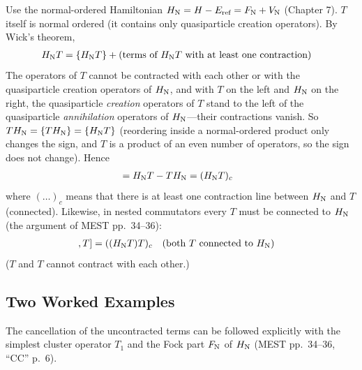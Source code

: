 Use the normal-ordered Hamiltonian $H_{\mathrm{N}}  = H - E_{\text{ref}} = F_{\mathrm{N}}  + V_{\mathrm{N}}$ (Chapter 7). $T$ itself is normal ordered (it contains only quasiparticle creation operators). By Wick's theorem,
\begin{align*}
H_{\mathrm{N}} T &= \{H_{\mathrm{N}} T\} + (\text{terms of } H_{\mathrm{N}} T \text{ with at least one contraction})
\end{align*}
The operators of $T$ cannot be contracted with each other or with the quasiparticle creation operators of $H_{\mathrm{N}}$, and with $T$ on the left and $H_{\mathrm{N}}$ on the right, the quasiparticle \emph{creation} operators of $T$ stand to the left of the quasiparticle \emph{annihilation} operators of $H_{\mathrm{N}}$---their contractions vanish. So $T H_{\mathrm{N}}  = \{T H_{\mathrm{N}} \} = \{H_{\mathrm{N}}  T\}$ (reordering inside a normal-ordered product only changes the sign, and $T$ is a product of an even number of operators, so the sign does not change). Hence
\begin{align*}
[\HN , T] &= \HN  T - T \HN  = (\HN  T)_c
\end{align*}
where $(\dots)_c$ means that there is at least one contraction line between $H_{\mathrm{N}}$ and $T$ (connected). Likewise, in nested commutators every $T$ must be connected to $H_{\mathrm{N}}$ (the argument of MEST pp.~34--36):
\begin{align*}
[[\HN, T], T] &= ((\HN T) T)_c \quad (\text{both } T \text{ connected to } \HN)
\end{align*}
($T$ and $T$ cannot contract with each other.)

\subsection{Two Worked Examples}

The cancellation of the uncontracted terms can be followed explicitly with the simplest cluster operator $T_1$ and the Fock part $F_{\mathrm{N}}$ of $H_{\mathrm{N}}$ (MEST pp.~34--36, “CC” p.~6).

